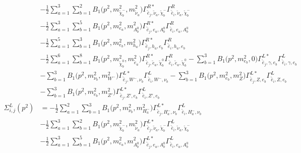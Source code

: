 \begin{itemize}
\begin{align}
 &-\frac{1}{2} \sum_{a=1}^{3}\sum_{b=1}^{2}{B_1\Big(p^{2},m^2_{\tilde{\chi}^-_{{b}}},m^2_{\tilde{\nu}_{{a}}}\Big)} {\Gamma^{R*}_{\check{\bar{e}}_{{j}},\tilde{\nu}_{{a}},\tilde{\chi}^-_{{b}}}} {\Gamma^R_{\check{\bar{e}}_{{i}},\tilde{\nu}_{{a}},\tilde{\chi}^-_{{b}}}}  \nonumber \\ 
 &-\frac{1}{2} \sum_{a=1}^{3}\sum_{b=1}^{5}{B_1\Big(p^{2},m^2_{e_{{a}}},m^2_{A^0_{{b}}}\Big)} {\Gamma^{R*}_{\check{\bar{e}}_{{j}},e_{{a}},A^0_{{b}}}} {\Gamma^R_{\check{\bar{e}}_{{i}},e_{{a}},A^0_{{b}}}}  \nonumber \\ 
 &-\frac{1}{2} \sum_{a=1}^{5}\sum_{b=1}^{3}{B_1\Big(p^{2},m^2_{e_{{b}}},m^2_{h_{{a}}}\Big)} {\Gamma^{R*}_{\check{\bar{e}}_{{j}},h_{{a}},e_{{b}}}} {\Gamma^R_{\check{\bar{e}}_{{i}},h_{{a}},e_{{b}}}}  \nonumber \\ 
 &-\frac{1}{2} \sum_{a=1}^{6}\sum_{b=1}^{8}{B_1\Big(p^{2},m^2_{\tilde{\chi}^0_{{b}}},m^2_{\tilde{e}_{{a}}}\Big)} {\Gamma^{R*}_{\check{\bar{e}}_{{j}},\tilde{e}_{{a}},\tilde{\chi}^0_{{b}}}} {\Gamma^R_{\check{\bar{e}}_{{i}},\tilde{e}_{{a}},\tilde{\chi}^0_{{b}}}}  - \sum_{b=1}^{3}{B_1\Big(p^{2},m^2_{e_{{b}}},0\Big)} {\Gamma^{L*}_{\check{\bar{e}}_{{j}},\gamma,e_{{b}}}} {\Gamma^L_{\check{\bar{e}}_{{i}},\gamma,e_{{b}}}}  \nonumber \\ 
 &- \sum_{b=1}^{3}{B_1\Big(p^{2},m^2_{\nu_{{b}}},m^2_{W^-}\Big)} {\Gamma^{L*}_{\check{\bar{e}}_{{j}},W^-,\nu_{{b}}}} {\Gamma^L_{\check{\bar{e}}_{{i}},W^-,\nu_{{b}}}}  - \sum_{b=1}^{3}{B_1\Big(p^{2},m^2_{e_{{b}}},m^2_{Z}\Big)} {\Gamma^{L*}_{\check{\bar{e}}_{{j}},Z,e_{{b}}}} {\Gamma^L_{\check{\bar{e}}_{{i}},Z,e_{{b}}}}  \nonumber \\ 
 &- \sum_{b=1}^{3}{B_1\Big(p^{2},m^2_{e_{{b}}},m^2_{{Z'}}\Big)} {\Gamma^{L*}_{\check{\bar{e}}_{{j}},{Z'},e_{{b}}}} {\Gamma^L_{\check{\bar{e}}_{{i}},{Z'},e_{{b}}}}  \\ 
\Sigma^L_{i,j}(p^2) &= -\frac{1}{2} \sum_{a=1}^{2}\sum_{b=1}^{3}{B_1\Big(p^{2},m^2_{\nu_{{b}}},m^2_{H^-_{{a}}}\Big)} {\Gamma^{L*}_{\check{\bar{e}}_{{j}},H^-_{{a}},\nu_{{b}}}} {\Gamma^L_{\check{\bar{e}}_{{i}},H^-_{{a}},\nu_{{b}}}}  \nonumber \\ 
 &-\frac{1}{2} \sum_{a=1}^{3}\sum_{b=1}^{2}{B_1\Big(p^{2},m^2_{\tilde{\chi}^-_{{b}}},m^2_{\tilde{\nu}_{{a}}}\Big)} {\Gamma^{L*}_{\check{\bar{e}}_{{j}},\tilde{\nu}_{{a}},\tilde{\chi}^-_{{b}}}} {\Gamma^L_{\check{\bar{e}}_{{i}},\tilde{\nu}_{{a}},\tilde{\chi}^-_{{b}}}}  \nonumber \\ 
 &-\frac{1}{2} \sum_{a=1}^{3}\sum_{b=1}^{5}{B_1\Big(p^{2},m^2_{e_{{a}}},m^2_{A^0_{{b}}}\Big)} {\Gamma^{L*}_{\check{\bar{e}}_{{j}},e_{{a}},A^0_{{b}}}} {\Gamma^L_{\check{\bar{e}}_{{i}},e_{{a}},A^0_{{b}}}}  \nonumber \\ 

\end{align}
\end{itemize}
